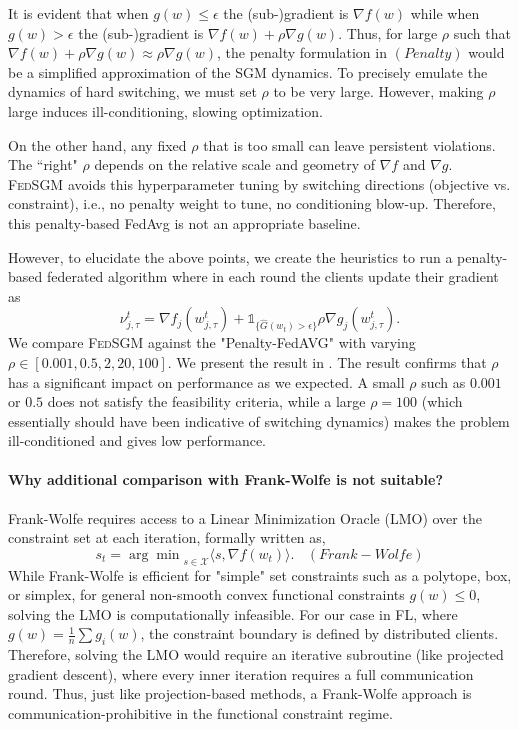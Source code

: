\documentclass{article} %
\begin{document}
It is evident that when $g(w) \leq \epsilon$ the (sub-)gradient is $\nabla f(w)$ while when $g(w) > \epsilon$ the (sub-)gradient is $\nabla f(w) + \rho \nabla g(w)$. Thus, for large $\rho$ such that $\nabla f(w) + \rho \nabla g(w) \approx \rho \nabla g(w)$, the penalty formulation in $(Penalty)$ would be a simplified approximation of the SGM dynamics. To precisely emulate the dynamics of hard switching, we must set $\rho$ to be very large. However, making $\rho$ large induces ill-conditioning, slowing optimization.

On the other hand, any fixed $\rho$ that is too small can leave persistent violations. The ``right" $\rho$ depends on the relative scale and geometry of $\nabla f$ and $\nabla g$. \textsc{FedSGM} avoids this hyperparameter tuning by switching directions (objective vs. constraint), i.e., no penalty weight to tune, no conditioning blow-up. Therefore, this penalty-based FedAvg is not an appropriate baseline.

However, to elucidate the above points, we create the heuristics to run a penalty-based federated algorithm where in each round the clients update their gradient as $$
\nu_{j,\tau}^t = \nabla f_j(w_{j,\tau}^t) + \mathds{1}_{\{\hat{G}(w_t) > \epsilon\}} \rho \nabla g_j(w_{j,\tau}^t).
$$
We compare \textsc{FedSGM} against the "Penalty-FedAVG" with varying $\rho \in [0.001, 0.5, 2, 20, 100]$. We present the result in . The result confirms that $\rho$ has a significant impact on performance as we expected. A small $\rho$ such as $0.001$ or $0.5$ does not satisfy the feasibility criteria, while a large $\rho = 100$ (which essentially should have been indicative of switching dynamics) makes the problem ill-conditioned and gives low performance.

\paragraph{Why additional comparison with Frank-Wolfe is not suitable?}

Frank-Wolfe \citet{pokutta2024frank,dadras2024federated} requires access to a Linear Minimization Oracle (LMO) over the constraint set at each iteration, formally written as,
$$s_t = {\displaystyle\arg\min}_{s \in \boldsymbol{\mathcal{X}}} \langle s, \nabla f(w_t) \rangle. \ \ \ \ (Frank-Wolfe)$$
While Frank-Wolfe is efficient for "simple" set constraints such as a polytope, box, or simplex, for general non-smooth convex functional constraints $g(w) \leq 0$, solving the LMO is computationally infeasible. For our case in FL, where $g(w) = \frac{1}{n}\sum g_i(w)$, the constraint boundary is defined by distributed clients. Therefore, solving the LMO would require an iterative subroutine (like projected gradient descent), where every inner iteration requires a full communication round. Thus, just like projection-based methods, a Frank-Wolfe approach is communication-prohibitive in the functional constraint regime.
\end{document}
